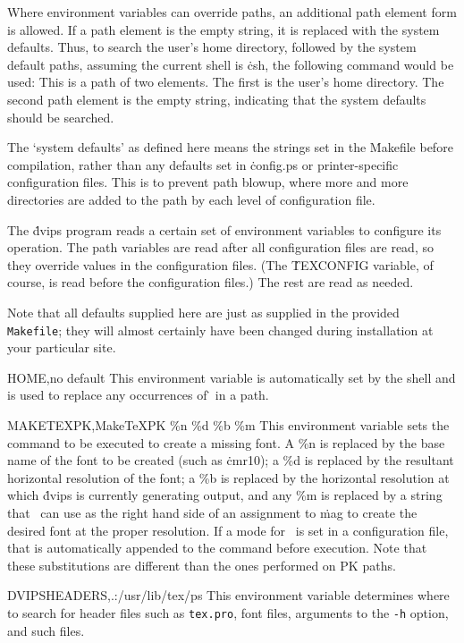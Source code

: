 Where environment variables can override paths, an additional path
element form is allowed.  If a path element is the empty string, it
is replaced with the system defaults.  Thus, to
search the user's home directory, followed by the system
default paths, assuming the current shell is \.{csh},
the following command would be used:
\noindent
This is a path of two elements.  The first is the user's home directory.
The second path element is the empty string, indicating that
the system defaults should be searched.

The `system defaults' as defined here means the strings set in the
\.{Makefile} before compilation, rather than any defaults set in
\.{config.ps} or printer-specific configuration files.  This is to
prevent path blowup, where more and more directories are added to the
path by each level of configuration file.


The \.{dvips} program reads a certain set of environment variables to
configure its operation.  The path variables are read after all
configuration files are read, so they override values in the configuration
files.  (The \.{TEXCONFIG} variable, of course, is read before the
configuration files.)  The rest are read as needed.

Note that all defaults supplied here are just as supplied in the
provided {\tt Makefile}; they will almost certainly have been changed
during installation at your particular site.

\descenv HOME,{\rm no default}
  This environment variable is automatically set by the shell and is
used to replace any occurrences of \.{\tilde} in a path.

\descenv MAKETEXPK,{MakeTeXPK \%n \%d \%b \%m}
This environment variable sets the command to be executed to create
a missing font.  A \%n is replaced by the base name of the font to
be created (such as \.{cmr10}); a \%d is replaced by the resultant
horizontal resolution of the font; a \%b is replaced by the
horizontal resolution at which \.{dvips} is currently generating
output, and any \%m is replaced by a string that \MF\ can use as
the right hand side of an assignment to \.{mag} to create the
desired font at the proper resolution.  If a mode for \MF\ is set in
a configuration file, that is automatically appended to the command
before execution.  Note that these substitutions are different than
the ones performed on PK paths.

\descenv DVIPSHEADERS,{.:/usr/lib/tex/ps}
  This environment variable determines where to search for header
files such as {\tt tex.pro}, font files, arguments to the
{\tt -h} option, and such files.

